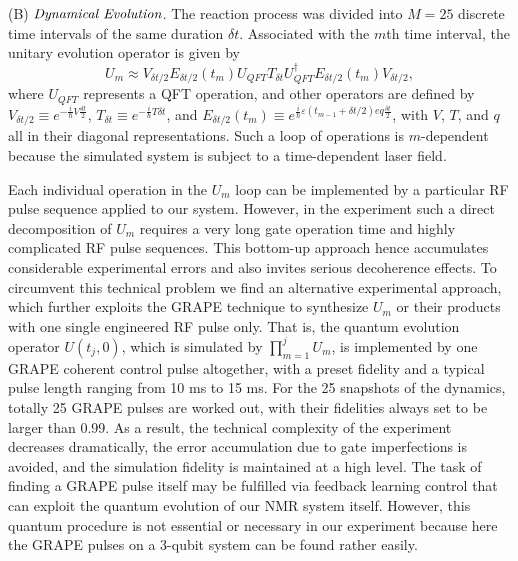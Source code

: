 \documentclass[prl,twocolumn,showpacs]{revtex4}
\begin{document}
(B) $\emph{Dynamical Evolution}$. The reaction process was divided into $M=25$ discrete time intervals of the same duration $\delta t$.
Associated with the $m$th time interval, the unitary evolution operator is given by
\begin{equation}
U_m\approx V_{\delta t/2}{E}_{\delta t/2}(t_m)U_{QFT}T_{\delta t}U_{QFT}^{\dagger}{E}_{\delta t/2}(t_{m}){V}_{\delta t/2},
\end{equation}
where $U_{QFT}$ represents a QFT operation, and other operators are defined by ${V}_{\delta t/2}\equiv e^{-\frac{i}{\hbar}{V}\frac{\delta t}{2}}$, ${T}_{\delta t} \equiv e^{-\frac{i}{\hbar}{T}\delta t}$, and ${E}_{\delta t/2}(t_m)\equiv e^{\frac{i}{\hbar}\varepsilon(t_{m-1}+\delta t/2) e q\frac{\delta t}{2}}$, with $V$, $T$, and $q$ all in their diagonal representations.  Such a loop of operations is $m$-dependent because the simulated system is subject to a time-dependent laser field.

Each individual operation in the $U_m$ loop  can be implemented by a particular RF pulse sequence applied to our system. However, in the experiment such a direct decomposition of $U_m$ requires a very long gate operation time and highly complicated RF pulse sequences. This bottom-up approach hence accumulates considerable experimental errors and
also invites serious decoherence effects. To circumvent this technical problem we find an alternative experimental approach, which further
exploits the GRAPE technique to synthesize $U_m$ or their products with one single engineered RF pulse only. That is, the quantum evolution operator $U(t_j, 0)$, which is simulated by $\prod_{m=1}^{j}U_m$, is implemented by one GRAPE coherent control pulse altogether, with a preset fidelity and a typical pulse length ranging from 10 ms to 15 ms.  For the 25 snapshots of the dynamics, totally 25 GRAPE pulses are worked out, with their fidelities always set to be larger than 0.99.  As a result, the technical complexity of the experiment decreases dramatically, the error accumulation due to gate imperfections is avoided, and the simulation fidelity is maintained at a high level.  The task of finding a GRAPE pulse itself may be fulfilled via feedback learning control \cite{rabitz} that can exploit the quantum evolution of our NMR system itself.  However, this quantum procedure is not essential or necessary in our experiment because here the GRAPE pulses on a 3-qubit system can be found rather easily.
\end{document}
